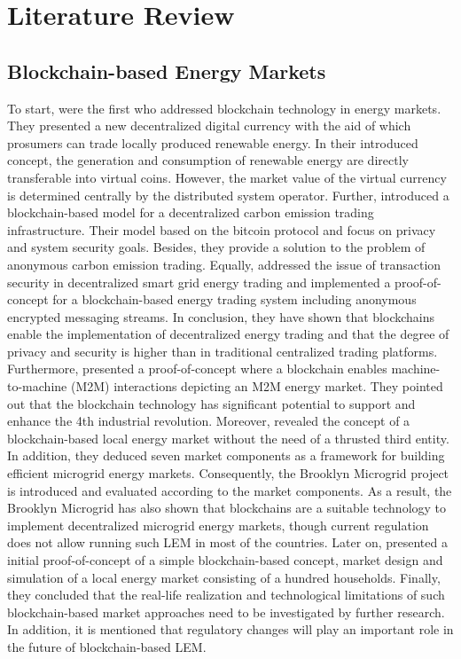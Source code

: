 \section{Literature Review}
\label{sec:literature_review}

\subsection{Blockchain-based Energy Markets}
\label{sec:Blockchain-based Energy Markets}
To start,  were the first who addressed blockchain technology in
energy markets. They presented a new decentralized digital currency with the aid of
which prosumers can trade locally produced renewable energy.
In their introduced concept, the generation and consumption of renewable energy are directly
transferable into virtual coins. However, the market value of the virtual currency is determined
centrally by the distributed system operator. Further,  introduced a blockchain-based
model for a decentralized carbon emission trading infrastructure.
Their model based on the bitcoin protocol and focus on privacy and system security goals.
Besides, they provide a solution to the problem of anonymous carbon emission trading.
Equally,  addressed the issue of transaction security in
decentralized smart grid energy trading and implemented a proof-of-concept for a
blockchain-based energy trading system including anonymous encrypted messaging streams.
In conclusion, they have shown that blockchains enable the implementation of decentralized energy trading and that the degree
of privacy and security is higher than in traditional centralized trading platforms. 
Furthermore, 
presented a proof-of-concept where a blockchain enables machine-to-machine (M2M) interactions depicting an
M2M energy market. They pointed out that the blockchain technology has
significant potential to support and enhance the 4th industrial revolution. 
Moreover, 
revealed the concept of a blockchain-based local energy market without the need of a thrusted
third entity. In addition, they deduced seven market
components as a framework for building efficient microgrid energy markets. Consequently,
the Brooklyn Microgrid project is introduced and evaluated according to the market components.
As a result, the Brooklyn Microgrid has also shown that blockchains are a suitable technology
to implement decentralized microgrid energy markets, though current regulation does not
allow running such LEM in most of the countries. Later on, 
presented a initial proof-of-concept of a simple blockchain-based concept, market design and
simulation of a local energy market consisting of a hundred households.
Finally, they concluded that the real-life realization and technological limitations of such blockchain-based
market approaches need to be investigated by further research. 
In addition, it is mentioned that regulatory
changes will play an important role in the future of blockchain-based LEM.

